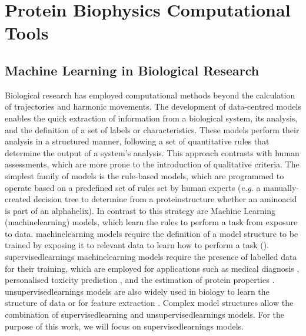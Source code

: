 \section{Protein Biophysics Computational Tools}

\subsection{Machine Learning in Biological Research}

Biological research has employed computational methods beyond the calculation of trajectories and harmonic movements. The development of data-centred models enables the quick extraction of information from a biological system, its analysis, and the definition of a set of labels or characteristics. These models perform their analysis in a structured manner, following a set of quantitative rules that determine the output of a system's analysis. This approach contrasts with human assessments, which are more prone to the introduction of qualitative criteria. The simplest family of models is the rule-based models, which are programmed to operate based on a predefined set of rules set by human experts (\textit{e.g.} a manually-created decision tree to determine from a \gls{proteinstructure} whether an \gls{aminoacid} is part of an \gls{alphahelix}). In contrast to this strategy are Machine Learning (\gls{machinelearning}) models, which learn the rules to perform a task from exposure to data. \gls{machinelearning} models require the definition of a model structure to be trained by exposing it to relevant data to learn how to perform a task (). \Glspl{supervisedlearning} \gls{machinelearning} models require the presence of labelled data for their training, which are employed for applications such as medical diagnosis \cite{kourou_machine_2015, capper_dna_2018}, personalised toxicity prediction \cite{vo_overview_2020, badwan_machine_2023}, and the estimation of protein properties \cite{cilia_protein_2013, orlando_accurate_2020, raimondi_exploring_2017, orlando_prediction_2022}. \Glspl{unsupervisedlearning} models are also widely used in biology to learn the structure of data \cite{chou_predicting_2006, maisuradze_principal_2009} or for feature extraction \cite{vaswani_attention_2023, church_word2vec_2017}. Complex model structures allow the combination of \gls{supervisedlearning} and \glspl{unsupervisedlearning} models. For the purpose of this work, we will focus on \glspl{supervisedlearning} models.


